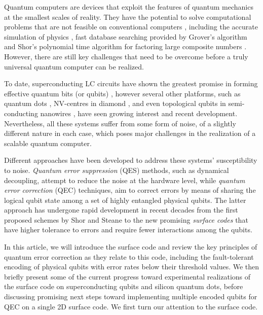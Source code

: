 Quantum computers are devices that exploit the features of quantum mechanics at
the smallest scales of reality. They have the potential to solve computational
problems that are not feasible on conventional computers
\cite{nielsen_chuang_2010}, including the accurate simulation of physics
\cite{feynman82_simul_physic_with_comput}, fast database searching provided by
Grover's algorithm \cite{Grover_1996} and Shor's polynomial time algorithm for
factoring large composite numbers \cite{Shor_1997}. However, there are still key
challenges that need to be overcome before a truly universal quantum computer
can be realized.

To date, superconducting LC circuits have shown the greatest promise in forming
effective quantum bits (or qubits) \cite{Rol_2019}
\cite{barends14_super_quant_circuit_at_surfac}, however several other platforms,
such as quantum dots \cite{huang19_fidel_bench_two_qubit_gates_silic}
\cite{Lawrie_2020}, NV-centres in diamond \cite{Taminiau_2014}, and even
topological qubits in semi-conducting nanowires \cite{Mourik_2012}, have seen
growing interest and recent development. Nevertheless, all these systems suffer
from some form of noise, of a slightly different nature in each case, which
poses major challenges in the realization of a scalable quantum computer.

Different approaches have been developed to address these systems'
susceptibility to noise. \textit{Quantum error suppression} (QES) methods, such
as dynamical decoupling, attempt to reduce the noise at the hardware level,
while \textit{quantum error correction} (QEC) techniques, aim to correct errors
by means of sharing the logical qubit state among a set of highly entangled
physical qubits. The latter approach has undergone rapid development in recent
decades from the first proposed schemes by Shor \cite{Shor_1995_QEC} and Steane
\cite{Steane_1996_QEC} to the new promising \textit{surface codes}
\cite{fowler12_surfac_codes} that have higher tolerance to errors and require
fewer interactions among the qubits.

In this article, we will introduce the surface code and review the key
principles of quantum error correction as they relate to this code, including
the fault-tolerant encoding of physical qubits with error rates below their
threshold values. We then briefly present some of the current progress toward
experimental realizations of the surface code on superconducting qubits and
silicon quantum dots, before discussing promising next steps toward implementing
multiple encoded qubits for QEC on a single 2D surface code. We first turn our
attention to the surface code.

